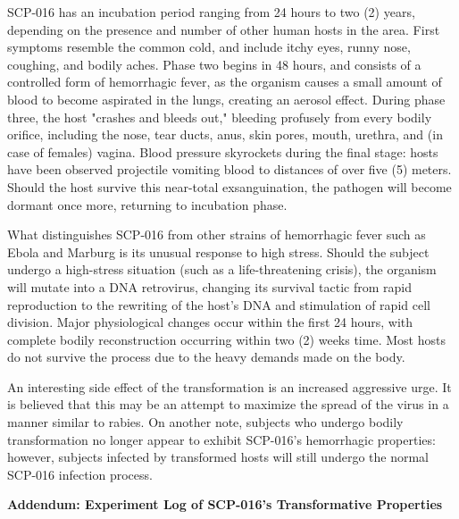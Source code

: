 SCP-016 has an incubation period ranging from 24 hours to two (2) years, depending on the presence and number of other human hosts in the area. First symptoms resemble the common cold, and include itchy eyes, runny nose, coughing, and bodily aches. Phase two begins in 48 hours, and consists of a controlled form of hemorrhagic fever, as the organism causes a small amount of blood to become aspirated in the lungs, creating an aerosol effect. During phase three, the host "crashes and bleeds out," bleeding profusely from every bodily orifice, including the nose, tear ducts, anus, skin pores, mouth, urethra, and (in case of females) vagina. Blood pressure skyrockets during the final stage: hosts have been observed projectile vomiting blood to distances of over five (5) meters. Should the host survive this near-total exsanguination, the pathogen will become dormant once more, returning to incubation phase.

What distinguishes SCP-016 from other strains of hemorrhagic fever such as Ebola and Marburg is its unusual response to high stress. Should the subject undergo a high-stress situation (such as a life-threatening crisis), the organism will mutate into a DNA retrovirus, changing its survival tactic from rapid reproduction to the rewriting of the host's DNA and stimulation of rapid cell division. Major physiological changes occur within the first 24 hours, with complete bodily reconstruction occurring within two (2) weeks time. Most hosts do not survive the process due to the heavy demands made on the body.

An interesting side effect of the transformation is an increased aggressive urge. It is believed that this may be an attempt to maximize the spread of the virus in a manner similar to rabies. On another note, subjects who undergo bodily transformation no longer appear to exhibit SCP-016's hemorrhagic properties: however, subjects infected by transformed hosts will still undergo the normal SCP-016 infection process.
\newpage
\begin{flushleft}
\textbf{Addendum: Experiment Log of SCP-016's Transformative Properties}
\end{flushleft}

